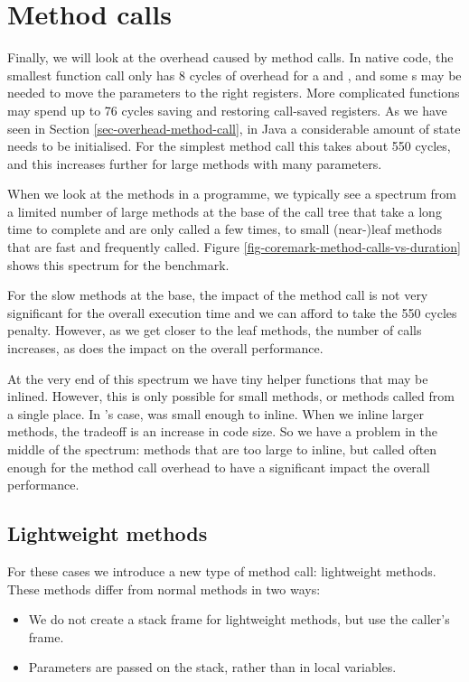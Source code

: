 \section{Method calls}
\label{sec-optimisations-method-calls}

Finally, we will look at the overhead caused by method calls. In native code, the smallest function call only has 8 cycles of overhead for a  and , and some s may be needed to move the parameters to the right registers. More complicated functions may spend up to 76 cycles saving and restoring call-saved registers. As we have seen in Section \ref{sec-overhead-method-call}, in Java a considerable amount of state needs to be initialised. For the simplest method call this takes about 550 cycles, and this increases further for large methods with many parameters.

When we look at the methods in a programme, we typically see a spectrum from a limited number of large methods at the base of the call tree that take a long time to complete and are only called a few times, to small (near-)leaf methods that are fast and frequently called. Figure \ref{fig-coremark-method-calls-vs-duration} shows this spectrum for the  benchmark.

For the slow methods at the base, the impact of the method call is not very significant for the overall execution time and we can afford to take the 550 cycles penalty. However, as we get closer to the leaf methods, the number of calls increases, as does the impact on the overall performance.

At the very end of this spectrum we have tiny helper functions that may be inlined. However, this is only possible for small methods, or methods called from a single place. In 's case,  was small enough to inline. When we inline larger methods, the tradeoff is an increase in code size. So we have a problem in the middle of the spectrum: methods that are too large to inline, but called often enough for the method call overhead to have a significant impact the overall performance.

\subsection{Lightweight methods}
For these cases we introduce a new type of method call: lightweight methods. These methods differ from normal methods in two ways:
\begin{itemize}
	\item We do not create a stack frame for lightweight methods, but use the caller's frame.
	\item Parameters are passed on the stack, rather than in local variables.
\end{itemize}

